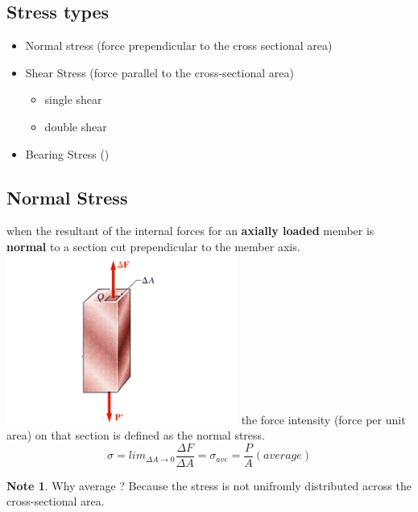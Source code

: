 \documentclass[11pt]{article}
\theoremstyle{definition}
\newtheorem{note}{Note}
\begin{document}
\subsection{Stress types}
\begin{itemize}

	\item Normal stress (force prependicular to the cross sectional area)
	\item Shear Stress (force parallel to the cross-sectional area)
		\begin{itemize}
		
		\item single shear
		\item double shear
		
		\end{itemize}
	\item Bearing Stress ()

\end{itemize}
\subsection{Normal Stress}
when the resultant of the internal forces for an \textbf{axially loaded} member is \textbf{normal} to a section cut prependicular to the member axis.
\includegraphics[scale=0.5]{figures/2021-03-30_22-07.png}
the force intensity (force per unit area) on that section is defined as the normal stress.
\begin{equation}
	\sigma = lim_{\Delta A \to 0} \frac{\Delta F}{\Delta A}  = \sigma_{ave} = \frac{P}{A} (average) 
\end{equation}
\begin{note}
Why average ? Because the stress is not unifromly distributed across the cross-sectional area.
\end{note}
\end{document}
